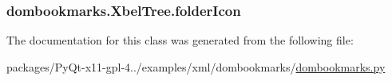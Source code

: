 \subsubsection[{folder\+Icon}]{\setlength{\rightskip}{0pt plus 5cm}dombookmarks.\+Xbel\+Tree.\+folder\+Icon}\label{classdombookmarks_1_1XbelTree_a36f38830f13ba756256049ceb5bcc53d}


The documentation for this class was generated from the following file\+:\begin{DoxyCompactItemize}
\item 
packages/\+Py\+Qt-\/x11-\/gpl-\/4../examples/xml/dombookmarks/\hyperlink{dombookmarks_8py}{dombookmarks.\+py}\end{DoxyCompactItemize}
